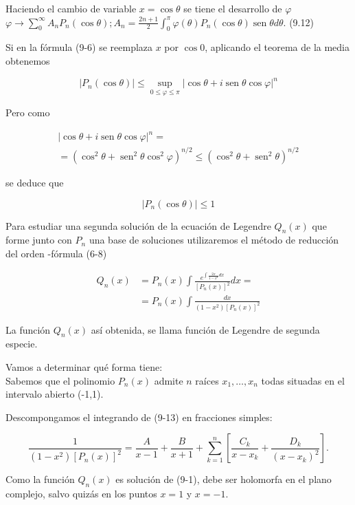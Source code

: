\documentclass[10pt]{article}
\theoremstyle{plain}
\theoremstyle{definition}
\theoremstyle{remark}
\begin{document}
Haciendo el cambio de variable $x=\cos \theta$ se tiene el desarrollo de $\varphi$\\
$\varphi \rightarrow \sum_{0}^{\infty} A_{n} P_{n}(\cos \theta) ; A_{n}=\frac{2 n+1}{2} \int_{0}^{\pi} \varphi(\theta) P_{n}(\cos \theta) \operatorname{sen} \theta d \theta$. (9.12)

Si en la fórmula (9-6) se reemplaza $x$ por $\cos 0$, aplicando el teorema de la media obtenemos

$$
\left|P_{n}(\cos \theta)\right| \leqslant \sup _{0 \leqslant \varphi \leqslant \pi}|\cos \theta+i \operatorname{sen} \theta \cos \varphi|^{n}
$$

Pero como

$$
\begin{gathered}
|\cos \theta+i \operatorname{sen} \theta \cos \varphi|^{n}= \\
=\left(\cos ^{2} \theta+\operatorname{sen}^{2} \theta \cos ^{2} \varphi\right)^{n / 2} \leqslant\left(\cos ^{2} \theta+\operatorname{sen}^{2} \theta\right)^{n / 2}
\end{gathered}
$$

se deduce que

$$
\left|P_{n}(\cos \theta)\right| \leqslant 1
$$

Para estudiar una segunda solución de la ecuación de Legendre $Q_{n}(x)$ que forme junto con $P_{n}$ una base de soluciones utilizaremos el método de reducción del orden -fórmula (6-8)


\begin{align*}
Q_{n}(x) & =P_{n}(x) \int \frac{e^{\int \frac{2 x}{1-x^{2}} d x}}{\left[P_{n}(x)\right]^{2}} d x= \\
& =P_{n}(x) \int \frac{d x}{\left(1-x^{2}\right)\left[P_{n}(x)\right]^{2}} \tag{9-13}
\end{align*}


La función $Q_{n}(x)$ así obtenida, se llama función de Legendre de segunda especie.

Vamos a determinar qué forma tiene:\\
Sabemos que el polinomio $P_{n}(x)$ admite $n$ raíces $x_{1}, \ldots, x_{n}$ todas situadas en el intervalo abierto (-1,1).

Descompongamos el integrando de (9-13) en fracciones simples:

$$
\frac{1}{\left(1-x^{2}\right)\left[P_{n}(x)\right]^{2}}=\frac{A}{x-1}+\frac{B}{x+1}+\sum_{k=1}^{n}\left[\frac{C_{k}}{x-x_{k}}+\frac{D_{k}}{\left(x-x_{k}\right)^{2}}\right] .
$$

Como la función $Q_{n}(x)$ es solución de (9-1), debe ser holomorfa en el plano complejo, salvo quizás en los puntos $x=1$ y $x=-1$.
\end{document}
